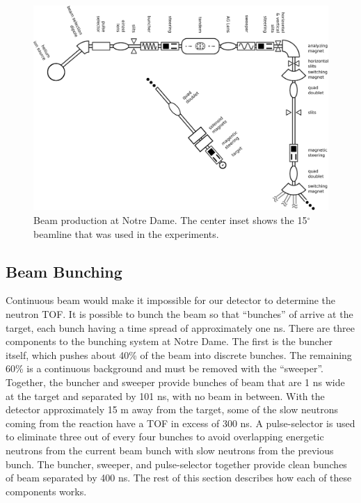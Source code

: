 \begin{figure}[htp]
\centering
\includegraphics[width=1.0\textwidth]{figures/NSL_beamline.eps}
\caption{Beam production at Notre Dame.  The center inset shows the 15$^{\circ}$ beamline that was used in the experiments.}
\label{fig:beamline}
\end{figure}

\subsection{Beam Bunching}

Continuous beam would make it impossible for our detector to determine the neutron TOF.  It is possible to bunch the beam so that ``bunches'' of  arrive at the target, each bunch having a time spread of approximately one ns. There are three components to the bunching system at Notre Dame.  The first is the buncher itself, which pushes about 40\% of the beam into discrete bunches.  The remaining 60\% is a continuous background and must be removed with the ``sweeper''.  Together, the buncher and sweeper provide bunches of beam that are 1 ns wide at the target and separated by 101 ns, with no beam in between.  With the detector approximately 15 m away from the target, some of the slow neutrons coming from the reaction have a TOF in excess of 300 ns.  A pulse-selector is used to eliminate three out of every four bunches to avoid overlapping energetic neutrons from the current beam bunch with slow neutrons from the previous bunch.  The buncher, sweeper, and pulse-selector together provide clean bunches of beam separated by 400 ns.  The rest of this section describes how each of these components works.

